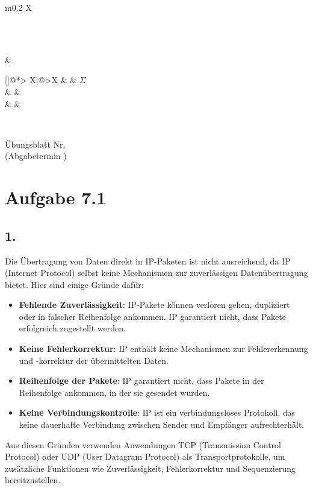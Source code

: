 \documentclass[a4paper]{scrartcl}
\makeatletter
\def\header#1#2{
  \begin{center}
    {\Large Übungsblatt #1}\\
    {(Abgabetermin #2)}
  \end{center}
}
\newcounter{punktelistectr}
\newcounter{punkte}
\newcommand{\punkteliste}[2]{%
  \setcounter{punkte}{#2}%
  \addtocounter{punkte}{-#1}%
  \stepcounter{punkte}%
  \begin{center}%
  \begin{tabularx}{\linewidth}[]{@{}*{\thepunkte}{>{\centering\arraybackslash} X|}@{}>{\centering\arraybackslash}X}
      \forloop{punktelistectr}{#1}{\value{punktelistectr} < #2 } %
      {%
        \thepunktelistectr &
      }
      #2 &  $\Sigma$ \\
      \hline
      \forloop{punktelistectr}{#1}{\value{punktelistectr} < #2 } %
      {%
        &
      } &\\
      \forloop{punktelistectr}{#1}{\value{punktelistectr} < #2 } %
      {%
        &
      } &\\
    \end{tabularx}
  \end{center}
}
\makeatother
\begin{document}
\begin{tabularx}{\linewidth}{m{0.2 \linewidth}X}
  \begin{minipage}{\linewidth}
    \STUDENTA\\
    \STUDENTB\\
    \STUDENTC
  \end{minipage} & \begin{minipage}{\linewidth}
    \punkteliste{1}{\EXERCISES}
  \end{minipage}\\
\end{tabularx}

\header{Nr. \NUMBER}{\DEADLINE}




\section*{Aufgabe 7.1}
\subsection*{1.}

Die Übertragung von Daten direkt in IP-Paketen ist nicht ausreichend, da IP (Internet Protocol) selbst keine Mechanismen zur zuverlässigen Datenübertragung bietet. Hier sind einige Gründe dafür:

\begin{itemize}
    \item \textbf{Fehlende Zuverlässigkeit}: IP-Pakete können verloren gehen, dupliziert oder in falscher Reihenfolge ankommen. IP garantiert nicht, dass Pakete erfolgreich zugestellt werden.
    \item \textbf{Keine Fehlerkorrektur}: IP enthält keine Mechanismen zur Fehlererkennung und -korrektur der übermittelten Daten.
    \item \textbf{Reihenfolge der Pakete}: IP garantiert nicht, dass Pakete in der Reihenfolge ankommen, in der sie gesendet wurden.
    \item \textbf{Keine Verbindungskontrolle}: IP ist ein verbindungsloses Protokoll, das keine dauerhafte Verbindung zwischen Sender und Empfänger aufrechterhält.
\end{itemize}

Aus diesen Gründen verwenden Anwendungen TCP (Transmission Control Protocol) oder UDP (User Datagram Protocol) als Transportprotokolle, um zusätzliche Funktionen wie Zuverlässigkeit, Fehlerkorrektur und Sequenzierung bereitzustellen.
\end{document}
